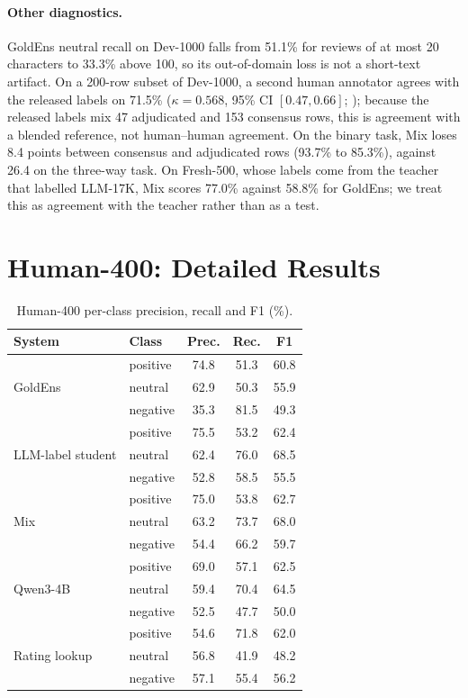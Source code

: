\paragraph{Other diagnostics.}
GoldEns neutral recall on Dev-1000 falls from 51.1\% for reviews of
at most 20 characters to 33.3\% above 100, so its out-of-domain loss
is not a short-text artifact. On a 200-row subset of Dev-1000, a
second human annotator agrees with the released labels on 71.5\%
($\kappa{=}0.568$, 95\% CI $[0.47, 0.66]$; \citealt{artstein2008});
because the released
labels mix 47 adjudicated and 153 consensus rows, this is agreement
with a blended reference, not human--human agreement. On the binary
task, Mix loses 8.4 points between consensus and adjudicated rows
(93.7\% to 85.3\%), against 26.4 on the three-way task. On Fresh-500,
whose labels come from the teacher that labelled LLM-17K, Mix scores
77.0\% against 58.8\% for GoldEns; we treat this as agreement with the
teacher rather than as a test.

\section{Human-400: Detailed Results}
\label{app:human400}

\begin{table}[h]
\centering\footnotesize
\setlength{\tabcolsep}{3.5pt}
\begin{tabular}{@{}llccc@{}}
\toprule
System & Class & Prec. & Rec. & F1 \\
\midrule
\multirow{3}{*}{GoldEns}
 & positive & 74.8 & 51.3 & 60.8 \\
 & neutral  & 62.9 & 50.3 & 55.9 \\
 & negative & 35.3 & 81.5 & 49.3 \\
\midrule
\multirow{3}{*}{LLM-label student}
 & positive & 75.5 & 53.2 & 62.4 \\
 & neutral  & 62.4 & 76.0 & 68.5 \\
 & negative & 52.8 & 58.5 & 55.5 \\
\midrule
\multirow{3}{*}{Mix}
 & positive & 75.0 & 53.8 & 62.7 \\
 & neutral  & 63.2 & 73.7 & 68.0 \\
 & negative & 54.4 & 66.2 & 59.7 \\
\midrule
\multirow{3}{*}{Qwen3-4B}
 & positive & 69.0 & 57.1 & 62.5 \\
 & neutral  & 59.4 & 70.4 & 64.5 \\
 & negative & 52.5 & 47.7 & 50.0 \\
\midrule
\multirow{3}{*}{Rating lookup}
 & positive & 54.6 & 71.8 & 62.0 \\
 & neutral  & 56.8 & 41.9 & 48.2 \\
 & negative & 57.1 & 55.4 & 56.2 \\
\bottomrule
\end{tabular}
\caption{Human-400 per-class precision, recall and F1 (\%).}
\label{tab:human400-perclass}
\end{table}

